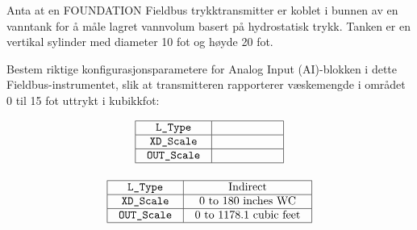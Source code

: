 

Anta at en FOUNDATION Fieldbus trykktransmitter er koblet i bunnen av en vanntank for å måle lagret vannvolum basert på hydrostatisk trykk. Tanken er en vertikal sylinder med diameter 10 fot og høyde 20 fot.

\vskip 10pt

Bestem riktige konfigurasjonsparametere for Analog Input (AI)-blokken i dette Fieldbus-instrumentet, slik at transmitteren rapporterer væskemengde i området 0 til 15 fot uttrykt i kubikkfot:


$$\vbox{\offinterlineskip
\halign{\strut
\vrule \quad\hfil # \ \hfil & 
\vrule \quad\hfil # \ \hfil \vrule \cr
\noalign{\hrule}
%
{\tt L\_Type} & \hskip 50pt \cr
%
\noalign{\hrule}
%
{\tt XD\_Scale} & \hskip 50pt \cr
%
\noalign{\hrule}
%
{\tt OUT\_Scale} & \hskip 50pt \cr
%
\noalign{\hrule}
} %
}$$ %








$$\vbox{\offinterlineskip
\halign{\strut
\vrule \quad\hfil # \ \hfil & 
\vrule \quad\hfil # \ \hfil \vrule \cr
\noalign{\hrule}
%
{\tt L\_Type} & Indirect \cr
%
\noalign{\hrule}
%
{\tt XD\_Scale} & 0 to 180 inches WC \cr
%
\noalign{\hrule}
%
{\tt OUT\_Scale} & 0 to 1178.1 cubic feet \cr
%
\noalign{\hrule}
} %
}$$ %











